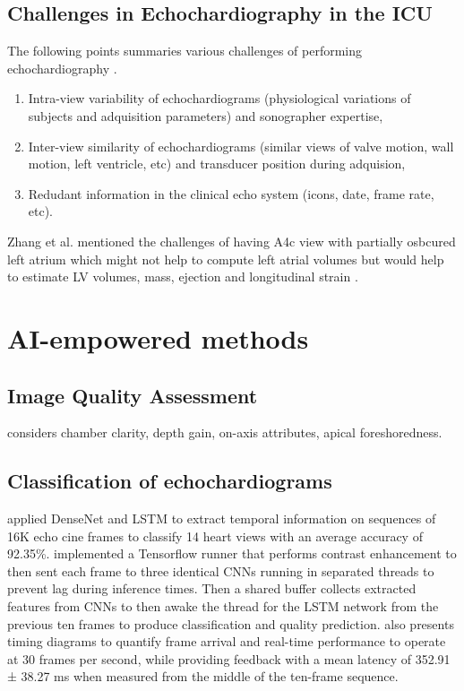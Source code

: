 \subsection{Challenges in Echochardiography in the ICU}
The following points summaries various challenges of performing echochardiography \cite{khamis2017}.
\begin{enumerate}
  \item Intra-view variability of echochardiograms (physiological variations of subjects and adquisition parameters) and sonographer expertise,
  \item Inter-view similarity of echochardiograms (similar views of valve motion, wall motion, left ventricle, etc) and transducer position during adquision,
  \item Redudant information in the clinical echo system (icons, date, frame rate, etc).
\end{enumerate}
Zhang et al. mentioned the challenges of having A4c view with partially osbcured left atrium which might not help to compute left atrial volumes but would help to estimate LV volumes, mass, ejection and longitudinal strain \cite{zhang2018}.


\section{AI-empowered methods}

\subsection{Image Quality Assessment}
\cite{labs2021_in_miua} considers chamber clarity, depth gain, on-axis attributes, apical foreshoredness.


\subsection{Classification of echochardiograms}
\cite{woudenberg2018} applied DenseNet and LSTM to extract temporal information on sequences of 16K echo cine frames to classify 14 heart views with an average accuracy of 92.35\%.
\cite{woudenberg2018} implemented a Tensorflow runner that performs contrast enhancement to then sent each frame to three identical CNNs running in separated threads to prevent lag during inference times.
Then a shared buffer collects extracted features from CNNs to then awake the thread for the LSTM network from the previous ten frames to produce classification and quality prediction.
\cite{woudenberg2018} also presents timing diagrams to quantify frame arrival and real-time performance to operate at 30 frames per second, while providing feedback with a mean latency of 352.91 ± 38.27 ms when measured from the middle of the ten-frame sequence.

